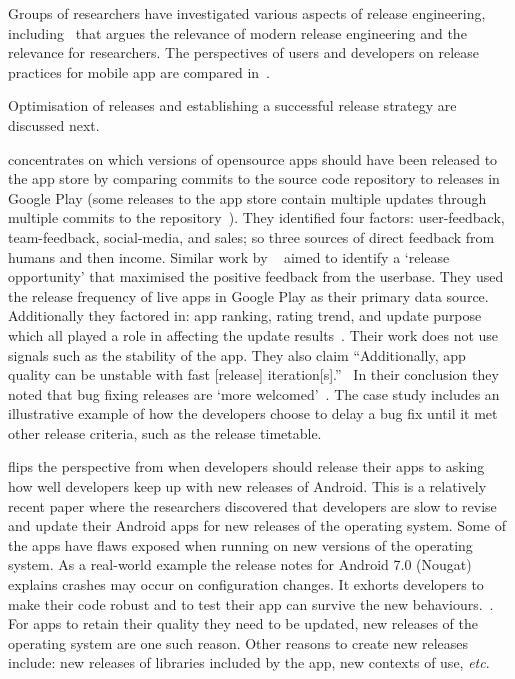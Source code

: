 Groups of researchers have investigated various aspects of release engineering, including~ that argues the relevance of modern release engineering and the relevance for researchers. The perspectives of users and developers on release practices for mobile app are compared in~.

Optimisation of releases and establishing a successful release strategy are discussed next. 

 concentrates on which versions of opensource apps should have been released to the app store by comparing commits to the source code repository to releases in Google Play (some releases to the app store contain multiple updates through multiple commits to the repository~). They identified four factors: user-feedback, team-feedback, social-media, and sales; so three sources of direct feedback from humans and then income. Similar work by ~ aimed to identify a `release opportunity' that maximised the positive feedback from the userbase. They used the release frequency of live apps in Google Play as their primary data source. Additionally they factored in: app ranking, rating trend, and update purpose which all played a role in affecting the update results~. Their work does not use signals such as the stability of the app. They also claim ``Additionally, app quality can be unstable with fast [release] iteration[s].''~ In their conclusion they noted that bug fixing releases are `more welcomed'~. The  case study includes an illustrative example of how the developers choose to delay a bug fix until it met other release criteria, such as the release timetable. %


 flips the perspective from when developers should release their apps to asking how well developers keep up with new releases of Android. This is a relatively recent paper where the researchers discovered that developers are slow to revise and update their Android apps for new releases of the operating system. Some of the apps have flaws exposed when running on new versions of the operating system. As a real-world example the release notes for Android 7.0 (Nougat) explains crashes may occur on configuration changes. It exhorts developers to make their code robust and to test their app can survive the new behaviours.~.
For apps to retain their quality they need to be updated, new releases of the operating system are one such reason. Other reasons to create new releases include: new releases of libraries included by the app, new contexts of use, \emph{etc}.

